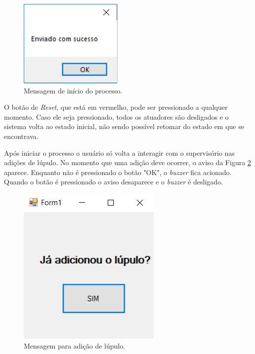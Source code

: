   \begin{figure}[htb]
	\caption{\label{mensagemdeinicio}Mensagem de início do processo.}
	\begin{center}
	    \includegraphics[width=0.25\linewidth]{./img/mensagemdeinicio.jpg}
	\end{center}
\end{figure}

O botão de \textit{Reset}, que está em vermelho, pode ser pressionado a qualquer momento. Caso ele seja pressionado, todos os atuadores são desligados e o sistema volta ao estado inicial, não sendo possível retomar do estado em que se encontrava.

Após iniciar o processo o usuário só volta a interagir com o supervisório nas adições de lúpulo. No momento que uma adição deve ocorrer, o aviso da Figura \ref{mensagemlupulo} aparece. Enquanto não é pressionado o botão "OK", o \textit{buzzer} fica acionado. Quando o botão é pressionado o aviso desaparece e o \textit{buzzer} é desligado.

  \begin{figure}[htb]
	\caption{\label{mensagemlupulo}Mensagem para adição de lúpulo.}
	\begin{center}
	    \includegraphics[width=0.25\linewidth]{./img/mensagemlupulo.jpg}
	\end{center}
\end{figure}
